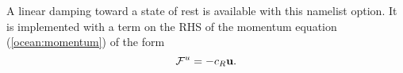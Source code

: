 A linear damping toward a state of rest is available with this namelist option.  It is implemented with a term on the RHS of the momentum equation (\ref{ocean:momentum}) of the form 
\begin{equation}
{\cal F}^u = -c_R {\bf u}.
\end{equation}

